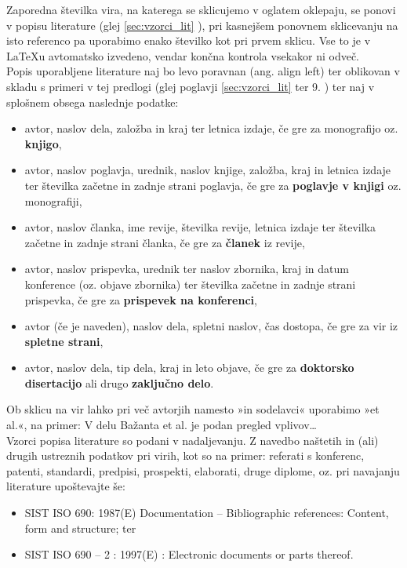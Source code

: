 Zaporedna številka vira, na katerega se sklicujemo v oglatem oklepaju, se ponovi v popisu literature (glej \ref{sec:vzorci_lit} ), pri kasnejšem ponovnem sklicevanju na isto referenco pa uporabimo enako številko kot pri prvem sklicu. Vse to je v \LaTeX u avtomatsko izvedeno, vendar končna kontrola vsekakor ni odveč. \\

Popis uporabljene literature naj bo levo poravnan (ang. align left) ter oblikovan v skladu s primeri v tej predlogi (glej poglavji \ref{sec:vzorci_lit}  ter 9. \refname{}) ter naj v splošnem obsega naslednje podatke:
\begin{itemize}
\item avtor, naslov dela, založba in kraj ter letnica izdaje, če gre za monografijo oz. \textbf{knjigo},
\item avtor, naslov poglavja, urednik, naslov knjige, založba, kraj in letnica izdaje ter številka začetne in zadnje strani poglavja, če gre za \textbf{poglavje v knjigi} oz. monografiji,
\item avtor, naslov članka, ime revije, številka revije, letnica izdaje ter številka začetne in zadnje strani članka, če gre za \textbf{članek} iz revije,
\item avtor, naslov prispevka, urednik ter naslov zbornika, kraj in datum konference (oz. objave zbornika) ter številka začetne in zadnje strani prispevka, če gre za \textbf{prispevek na konferenci},
\item avtor (če je naveden), naslov dela, spletni naslov, čas dostopa, če gre za vir iz \textbf{spletne strani},
\item avtor, naslov dela, tip dela, kraj in leto objave, če gre za \textbf{doktorsko disertacijo} ali drugo \textbf{zaključno delo}.
\end{itemize}

Ob sklicu na vir lahko pri več avtorjih namesto »in sodelavci« uporabimo »et al.«, na primer: V delu Bažanta et al. \cite{bazant_1991} je podan pregled vplivov\ldots\\

Vzorci popisa literature so podani v nadaljevanju. Z navedbo naštetih in (ali) drugih ustreznih podatkov pri virih, kot so na primer: referati s konferenc, patenti, standardi, predpisi, prospekti, elaborati, druge diplome, oz. pri navajanju literature upoštevajte še:
\begin{itemize}
\item SIST ISO 690: 1987(E) Documentation – Bibliographic references: Content, form and structure; ter
\item SIST ISO 690 – 2 : 1997(E) : Electronic documents or parts thereof.
\end{itemize}


